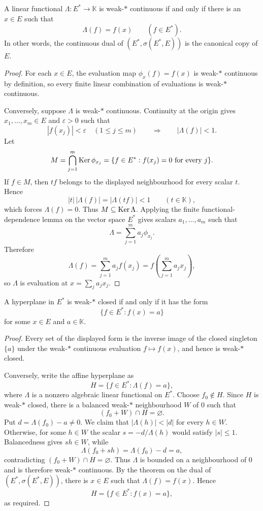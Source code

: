 \begin{notetheorem}
A linear functional $\Lambda\colon E^*\to\mathbb K$ is weak-$*$ continuous if
and only if there is an $x\in E$ such that
\[
  \Lambda(f)=f(x)\qquad(f\in E^*).
\]
In other words, the continuous dual of $(E^*,\sigma(E^*,E))$ is the canonical
copy of $E$.
\end{notetheorem}

\begin{proof}
For each $x\in E$, the evaluation map $\phi_x(f)=f(x)$ is weak-$*$
continuous by definition, so every finite linear combination of evaluations
is weak-$*$ continuous.

Conversely, suppose $\Lambda$ is weak-$*$ continuous.  Continuity at the
origin gives $x_1,\ldots,x_m\in E$ and $\varepsilon>0$ such that
\[
  |f(x_j)|<\varepsilon\quad(1\le j\le m)
  \qquad\Longrightarrow\qquad
  |\Lambda(f)|<1.
\]
Let
\[
  M=\bigcap_{j=1}^m\operatorname{Ker}\phi_{x_j}
   =\{f\in E^*:f(x_j)=0\text{ for every }j\}.
\]
If $f\in M$, then $tf$ belongs to the displayed neighbourhood for every
scalar $t$.  Hence
\[
  |t|\,|\Lambda(f)|=|\Lambda(tf)|<1
  \qquad(t\in\mathbb K),
\]
which forces $\Lambda(f)=0$.  Thus $M\subseteq\operatorname{Ker}\Lambda$.  Applying the
finite functional-dependence lemma on the vector space $E^*$ gives scalars
$a_1,\ldots,a_m$ such that
\[
  \Lambda=\sum_{j=1}^m a_j\phi_{x_j}.
\]
Therefore
\[
  \Lambda(f)
  =\sum_{j=1}^m a_j f(x_j)
  =f\left(\sum_{j=1}^m a_jx_j\right),
\]
so $\Lambda$ is evaluation at $x=\sum_j a_jx_j$.
\end{proof}

\begin{notecorollary}
A hyperplane in $E^*$ is weak-$*$ closed if and only if it has the form
\[
  \{f\in E^*:f(x)=a\}
\]
for some $x\in E$ and $a\in\mathbb K$.
\end{notecorollary}

\begin{proof}
Every set of the displayed form is the inverse image of the closed singleton
$\{a\}$ under the weak-$*$ continuous evaluation $f\mapsto f(x)$, and hence
is weak-$*$ closed.

Conversely, write the affine hyperplane as
\[
  H=\{f\in E^*:\Lambda(f)=a\},
\]
where $\Lambda$ is a nonzero algebraic linear functional on $E^*$.  Choose
$f_0\notin H$.  Since $H$ is weak-$*$ closed, there is a balanced weak-$*$
neighbourhood $W$ of $0$ such that
\[
  (f_0+W)\cap H=\varnothing.
\]
Put $d=\Lambda(f_0)-a\ne0$.  We claim that
$|\Lambda(h)|<|d|$ for every $h\in W$.  Otherwise, for some $h\in W$ the
scalar $s=-d/\Lambda(h)$ would satisfy $|s|\le1$.  Balancedness gives
$sh\in W$, while
\[
  \Lambda(f_0+sh)=\Lambda(f_0)-d=a,
\]
contradicting $(f_0+W)\cap H=\varnothing$.  Thus $\Lambda$ is bounded on a
neighbourhood of $0$ and is therefore weak-$*$ continuous.  By the theorem on
the dual of $(E^*,\sigma(E^*,E))$, there is $x\in E$ such that
$\Lambda(f)=f(x)$.  Hence
\[
  H=\{f\in E^*:f(x)=a\},
\]
as required.
\end{proof}

